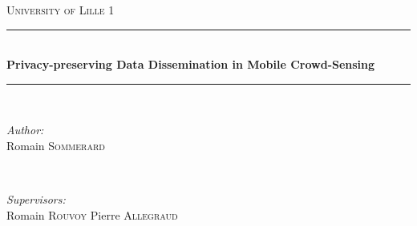 	
	\begin{titlepage}
		
		\newcommand{\HRule}{\rule{\linewidth}{0.5mm}} %
		
		\center %
		
		
		\textsc{\LARGE University of Lille 1}\\[1.5cm] %
		
		
		\HRule \\[0.4cm]
		\huge \bfseries Privacy-preserving Data Dissemination in Mobile Crowd-Sensing\\[0.4cm] %
		\HRule \\[1.5cm]
		
		
		\begin{minipage}{0.4\textwidth}
			\begin{flushleft} \large
				\emph{Author:}\\
				Romain \textsc{Sommerard} %
			\end{flushleft}
		\end{minipage}
		~
		\begin{minipage}{0.4\textwidth}
			\begin{flushright} \large
				\emph{Supervisors:} \\
				Romain \textsc{Rouvoy} %
				Pierre \textsc{Allegraud}
			\end{flushright}
		\end{minipage}\\[2cm]
		

\end{titlepage}
